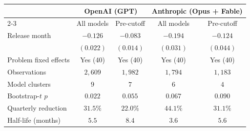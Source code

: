 \begin{tabular}{lcccc}
\toprule
 & \multicolumn{2}{c}{OpenAI (GPT)} & \multicolumn{2}{c}{Anthropic (Opus + Fable)} \\
\cmidrule{2-3}\cmidrule{4-5}
 & All models & Pre-cutoff & All models & Pre-cutoff \\
\midrule
Release month & $-0.126$ & $-0.083$ & $-0.194$ & $-0.124$ \\
 & $(0.022)$ & $(0.014)$ & $(0.031)$ & $(0.044)$ \\
\addlinespace
Problem fixed effects & Yes (40) & Yes (40) & Yes (40) & Yes (40) \\
Observations & $2{,}609$ & $1{,}982$ & $1{,}794$ & $1{,}183$ \\
Model clusters & $9$ & $7$ & $6$ & $4$ \\
Bootstrap-$t$ $p$ & $0.022$ & $0.055$ & $0.067$ & $0.090$ \\
\midrule
Quarterly reduction & $31.5\%$ & $22.0\%$ & $44.1\%$ & $31.1\%$ \\
Half-life (months) & $5.5$ & $8.4$ & $3.6$ & $5.6$ \\
\bottomrule
\end{tabular}
